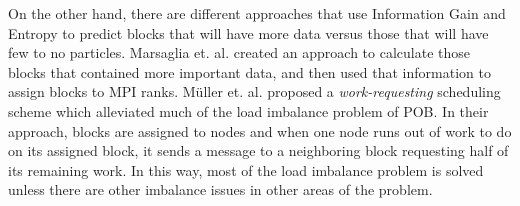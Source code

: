 \documentclass{IEEEtran}
\begin{document}
On the other hand, there are different approaches that use Information Gain and Entropy to predict blocks that will have more data versus those that will have few to no particles.
%
Marsaglia et. al. \cite {Marsaglia19} created an approach to calculate those blocks that contained more important data, and then used that information to assign blocks to MPI ranks.
%
Müller et. al. \cite{Muller13} proposed a \textit{work-requesting} scheduling scheme which alleviated much of the load imbalance problem of POB.
%
In their approach, blocks are assigned to nodes and when one node runs out of work to do on its assigned block, it sends a message to a neighboring block requesting half of its remaining work.
%
In this way, most of the load imbalance problem is solved unless there are other imbalance issues in other areas of the problem.
 
%
%
%
%
%
\end{document}
